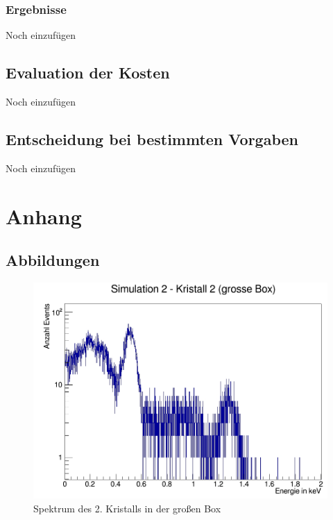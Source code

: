 \documentclass[a4paper,14pt,twoside]{article}
\begin{document}
			
			
		\subsubsection{Ergebnisse}
			{\color{Red} Noch einzufügen}
			
			
			
	\subsection{Evaluation der Kosten}
		{\color{Red} Noch einzufügen}
		
		
		
	\subsection{Entscheidung bei bestimmten Vorgaben}
		{\color{Red} Noch einzufügen}

			
\section{Anhang}
	\subsection{Abbildungen}
	
\begin{figure}[H]
	\begin{center}
		\includegraphics[width=0.7\linewidth]{Simulation2(2KGB)_ganz}
		\caption{Spektrum des 2. Kristalls in der großen Box}
		\label{}
	\end{center}
\end{figure}
\end{document}
